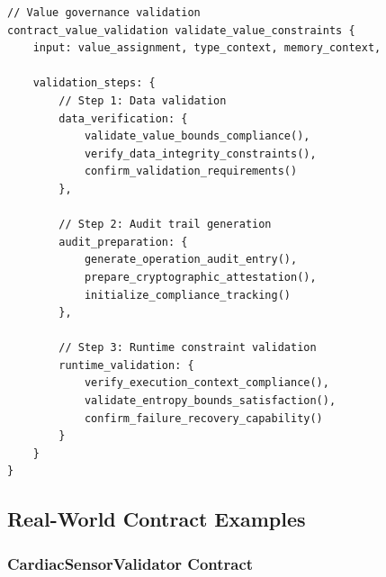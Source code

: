 \documentclass[11pt,letterpaper]{article}
\begin{document}
\begin{lstlisting}[language=rift, caption=Contract Validation Chain Implementation]
// Value governance validation
contract_value_validation validate_value_constraints {
    input: value_assignment, type_context, memory_context,
    
    validation_steps: {
        // Step 1: Data validation
        data_verification: {
            validate_value_bounds_compliance(),
            verify_data_integrity_constraints(),
            confirm_validation_requirements()
        },
        
        // Step 2: Audit trail generation
        audit_preparation: {
            generate_operation_audit_entry(),
            prepare_cryptographic_attestation(),
            initialize_compliance_tracking()
        },
        
        // Step 3: Runtime constraint validation
        runtime_validation: {
            verify_execution_context_compliance(),
            validate_entropy_bounds_satisfaction(),
            confirm_failure_recovery_capability()
        }
    }
}
\end{lstlisting}

\subsection{Real-World Contract Examples}

\subsubsection{CardiacSensorValidator Contract}
\end{document}
